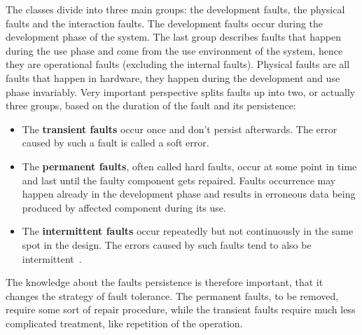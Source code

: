 The classes divide into three main groups: the development faults, the physical faults and the interaction faults. The development faults occur during the development phase of the system. The last group describes faults that happen during the use phase and come from the use environment of the system, hence they are operational faults (excluding the internal faults). Physical faults are all faults that happen in hardware, they happen during the development and use phase invariably.
Very important perspective splits faults up into two, or actually three groups, based on the duration of the fault and its persistence:
\begin{itemize}
    \item The \textbf{transient faults} occur once and don't persist afterwards. The error caused by such a fault is called a soft error.
    \item The \textbf{permanent faults}, often called hard faults, occur at some point in time and last until the faulty component gets repaired. Faults occurrence may happen already in the development phase and results in erroneous data being produced by affected component during its use. 
    \item The \textbf{intermittent faults} occur repeatedly but not continuously in the same spot in the design. The errors caused by such faults tend to also be intermittent~\cite{book:Sorin}.
\end{itemize}
The knowledge about the faults persistence is therefore important, that it changes the strategy of fault tolerance. The permanent faults, to be removed, require some sort of repair procedure, while the transient faults require much less complicated treatment, like repetition of the operation.

